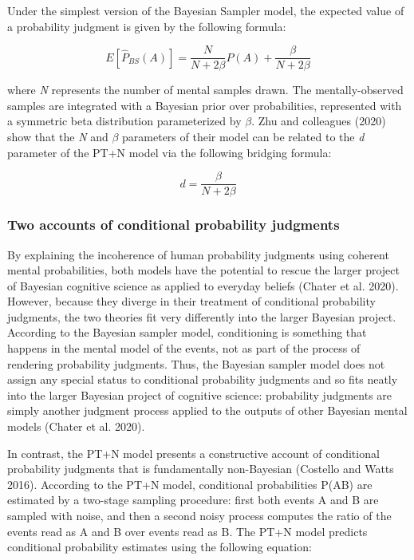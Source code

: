 \documentclass{article}
\begin{document}
Under the simplest version of the Bayesian Sampler model, the expected
value of a probability judgment is given by the following formula:

\[E[\hat{P}_{BS}(A)] = \frac{N}{N+2\beta}P(A) + \frac{\beta}{N+2\beta}\]

where \emph{N} represents the number of mental samples drawn. The
mentally-observed samples are integrated with a Bayesian prior over
probabilities, represented with a symmetric beta distribution
parameterized by \(\beta\). Zhu and colleagues (2020) show that the
\emph{N} and \(\beta\) parameters of their model can be related to the
\emph{d} parameter of the PT+N model via the following bridging formula:

\[d = \frac{\beta}{N+2\beta}\]

\hypertarget{two-accounts-of-conditional-probability-judgments}{%
\subsubsection{Two accounts of conditional probability
judgments}\label{two-accounts-of-conditional-probability-judgments}}

By explaining the incoherence of human probability judgments using
coherent mental probabilities, both models have the potential to rescue
the larger project of Bayesian cognitive science as applied to everyday
beliefs (Chater et al. 2020). However, because they diverge in their
treatment of conditional probability judgments, the two theories fit
very differently into the larger Bayesian project. According to the
Bayesian sampler model, conditioning is something that happens in the
mental model of the events, not as part of the process of rendering
probability judgments. Thus, the Bayesian sampler model does not assign
any special status to conditional probability judgments and so fits
neatly into the larger Bayesian project of cognitive science:
probability judgments are simply another judgment process applied to the
outputs of other Bayesian mental models (Chater et al. 2020).

In contrast, the PT+N model presents a constructive account of
conditional probability judgments that is fundamentally non-Bayesian
(Costello and Watts 2016). According to the PT+N model, conditional
probabilities P(A\textbar B) are estimated by a two-stage sampling
procedure: first both events A and B are sampled with noise, and then a
second noisy process computes the ratio of the events read as A and B
over events read as B. The PT+N model predicts conditional probability
estimates using the following equation:
\end{document}
